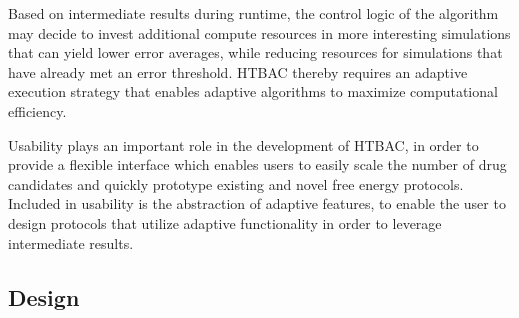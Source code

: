 


Based on intermediate results during runtime, the control logic of the
algorithm may decide to invest additional compute resources in more
interesting simulations that can yield lower error averages, while reducing
resources for simulations that have already met an error threshold.
HTBAC thereby requires an adaptive execution strategy 
 that enables 
adaptive algorithms to maximize computational efficiency. 

Usability plays an important role in the development of HTBAC, in order to
provide a flexible interface which enables users to easily scale the number
of drug candidates and quickly prototype existing and novel free energy
protocols. Included in usability is the abstraction of adaptive features, to 
enable the user to design protocols that utilize adaptive functionality in order
to leverage intermediate results.

\subsection{Design}

